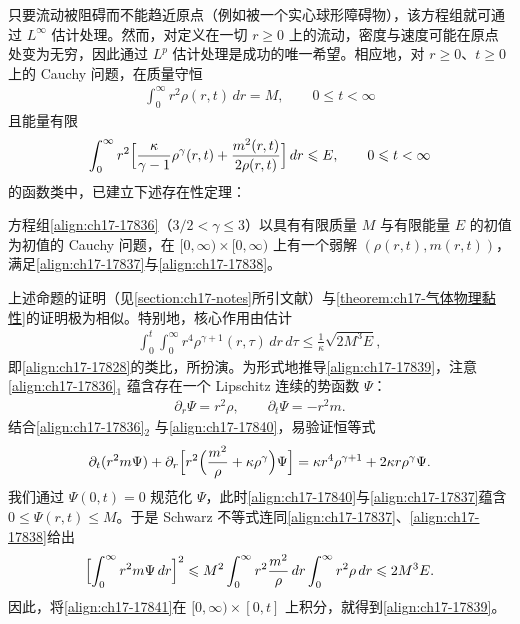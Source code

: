 \documentclass[../../main.tex]{subfiles}
\begin{document}
只要流动被阻碍而不能趋近原点（例如被一个实心球形障碍物），该方程组就可通过 $L^\infty$ 估计处理。然而，对定义在一切 $r\geqslant0$ 上的流动，密度与速度可能在原点处变为无穷，因此通过 $L^p$ 估计处理是成功的唯一希望。相应地，对 $r\geqslant0$、$t\geqslant0$ 上的 Cauchy 问题，在质量守恒
\begin{align}
\int_0^\infty r^2\rho(r,t)\,dr=M,\qquad 0\leqslant t<\infty
\label{align:ch17-17837}
\end{align}
且能量有限
\begin{align}
\int_0^\infty r^2\Bigl[\frac{\kappa}{\gamma-1}\rho^\gamma(r,t)+\frac{m^2(r,t)}{2\rho(r,t)}\Bigr]\,dr\leqslant E,\qquad 0\leqslant t<\infty
\label{align:ch17-17838}
\end{align}
的函数类中，已建立下述存在性定理：

\begin{theorem}[径向等熵气体的存在性]\label{theorem:ch17-径向气体}
方程组\eqref{align:ch17-17836}（$3/2<\gamma\leqslant3$）以具有有限质量 $M$ 与有限能量 $E$ 的初值为初值的 Cauchy 问题，在 $[0,\infty)\times[0,\infty)$ 上有一个弱解 $(\rho(r,t),m(r,t))$，满足\eqref{align:ch17-17837}与\eqref{align:ch17-17838}。
\end{theorem}

上述命题的证明（见\cref{section:ch17-notes}所引文献）与\cref{theorem:ch17-气体物理黏性}的证明极为相似。特别地，核心作用由估计
\begin{align}
\int_0^t\int_0^\infty r^4\rho^{\gamma+1}(r,\tau)\,dr\,d\tau\leqslant\frac{1}{\kappa}\sqrt{2M^3E},
\label{align:ch17-17839}
\end{align}
即\eqref{align:ch17-17828}的类比，所扮演。为形式地推导\eqref{align:ch17-17839}，注意\eqref{align:ch17-17836}$_1$ 蕴含存在一个 Lipschitz 连续的势函数 $\Psi$：
\begin{align}
\partial_r\Psi=r^2\rho,\qquad\partial_t\Psi=-r^2m.
\label{align:ch17-17840}
\end{align}
结合\eqref{align:ch17-17836}$_2$ 与\eqref{align:ch17-17840}，易验证恒等式
\begin{align}
\partial_t(r^2m\Psi)+\partial_r\Bigl[r^2\Bigl(\frac{m^2}{\rho}+\kappa\rho^\gamma\Bigr)\Psi\Bigr]=\kappa r^4\rho^{\gamma+1}+2\kappa r\rho^\gamma\Psi.
\label{align:ch17-17841}
\end{align}
我们通过 $\Psi(0,t)=0$ 规范化 $\Psi$，此时\eqref{align:ch17-17840}与\eqref{align:ch17-17837}蕴含 $0\leqslant\Psi(r,t)\leqslant M$。于是 Schwarz 不等式连同\eqref{align:ch17-17837}、\eqref{align:ch17-17838}给出
\begin{align}
\Bigl[\int_0^\infty r^2m\Psi\,dr\Bigr]^2\leqslant M^2\int_0^\infty r^2\frac{m^2}{\rho}\,dr\int_0^\infty r^2\rho\,dr\leqslant2M^3E.
\label{align:ch17-17842}
\end{align}
因此，将\eqref{align:ch17-17841}在 $[0,\infty)\times[0,t]$ 上积分，就得到\eqref{align:ch17-17839}。
\end{document}
